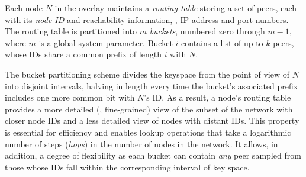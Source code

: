 Each node $N$ in the overlay maintains a \emph{routing table} storing a set of peers, each with its \emph{node ID} and reachability information, \ie, IP address and port numbers.
The routing table is partitioned into $m$ \textit{buckets}, numbered zero through $m-1$, where $m$ is a global system parameter.
Bucket $i$ contains a list of up to $k$ peers, whose IDs share a common prefix of length $i$ with $N$.



%
The bucket partitioning scheme divides the keyspace from the point of view of $N$ into disjoint intervals, halving in length every time the bucket's associated prefix includes one more common bit with $N$'s ID.
As a result, a node's routing table provides a more detailed (\ie, fine-grained) view of the subset of the network with closer node IDs and a less detailed view of nodes with distant IDs.
This property is essential for efficiency and enables lookup operations that take a logarithmic number of steps (\emph{hops}) in the number of nodes in the network.
It allows, in addition, a degree of flexibility as each bucket can contain \textit{any} peer sampled from those whose IDs fall within the corresponding interval of key space.

